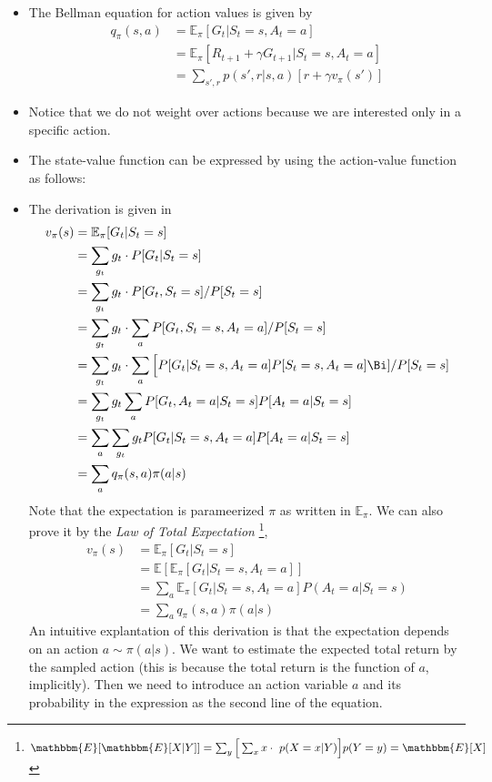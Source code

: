 \begin{itemize}
	\item The Bellman equation for action values is given by
	\begin{align*}
		q_{\pi}(s,a) &= \mathbb{E}_\pi[G_t|S_t=s, A_t=a]\\
		& = \mathbb{E}_\pi[R_{t+1} + \gamma G_{t+1}|S_t=s, A_t=a]\\
		& = \sum_{s',r}p(s',r|s,a)[r + \gamma v_\pi(s')]
	\end{align*}
	\item Notice that we do not weight over actions because we are interested only in a specific action.
	\item The state-value function can be expressed by using the action-value function as follows:
	\item The derivation is given in 
\begin{align*}
	v_\pi(s) &= \mathbb{E}_{\pi}[G_t|S_t = s]\\ 
	&= \sum_{g_t} g_t\cdot P[G_t|S_t=s]\\
	&= \sum_{g_t} g_t\cdot P[G_t,S_t=s]/P[S_t=s]\\
	&= \sum_{g_t} g_t\cdot \sum_a P[G_t,S_t=s, A_t=a]/P[S_t=s]\\
	&= \sum_{g_t} g_t\cdot \sum_a \Big[P[G_t|S_t=s, A_t=a]P[S_t=s, A_t=a]\Bi]/P[S_t=s]\\
	&= \sum_{g_t} g_t \sum_a P[G_t, A_t=a|S_t=s] P[A_t=a|S_t=s]\\
	&= \sum_{a} \sum_{g_t} g_t P[G_t|S_t=s, A_t=a] P[A_t=a|S_t=s]\\
	&= \sum_{a} q_\pi(s,a) \pi(a|s)
\end{align*}
Note that the expectation is parameerized $\pi$ as written in $\mathbb{E}_{\pi}$. We can also prove it by the \textit{Law of Total Expectation} \footnote{
$\mathbbm{E}[\mathbbm{E}[X|Y]] = \sum_{y}\Big[\sum_{x}x\cdot\ p(X=x|Y)\Big] p(Y=y) = \mathbbm{E}[X]$},
\begin{align*}
	v_\pi(s) &= \mathbb{E}_{\pi}[G_t|S_t = s]\\ 
	&= \mathbb{E}[\mathbb{E}_{\pi}[G_t|S_t=s, A_t=a]]\\
	&= \sum_{a} \mathbb{E}_{\pi}[G_t|S_t=s, A_t=a] P(A_t = a|S_t = s)\\
	&= \sum_{a} q_\pi(s,a) \pi(a|s)
\end{align*}
An intuitive explantation of this derivation is that the expectation depends on an action $a\sim \pi(a|s)$. We want to estimate the expected total return by the sampled action (this is because the total return is the function of $a$, implicitly). Then we need to introduce an action variable $a$ and its probability in the expression as the second line of the equation. 
\end{itemize}

